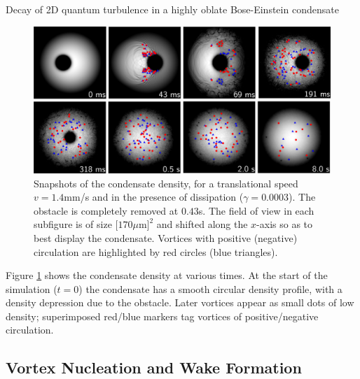 \begin{chapter}{\label{cha:shin}Decay of 2D quantum turbulence in a highly oblate Bose-Einstein condensate}
\begin{figure}
\centering
\includegraphics[width=0.95\linewidth]{shin/fig2_4x2}
\caption{\label{fig:densSnapshots} Snapshots of the condensate density, for a translational speed $v=1.4$mm/s and in the presence of dissipation ($\gamma=0.0003$). The obstacle is completely removed at $0.43$s. The field of view in each subfigure is of size $[170\mu$m$]^2$ and shifted along the $x$-axis so as to best display the condensate.  Vortices with positive (negative) circulation are highlighted by red circles (blue triangles).
}
\end{figure}

Figure \ref{fig:densSnapshots} shows the condensate density at various times. At the start of the simulation ($t=0$) the condensate has a smooth circular density profile, with a density depression due to the obstacle.  Later vortices appear as small dots of low density; superimposed red/blue markers tag vortices of positive/negative circulation.

\subsection{Vortex Nucleation and Wake Formation}


\end{chapter}
